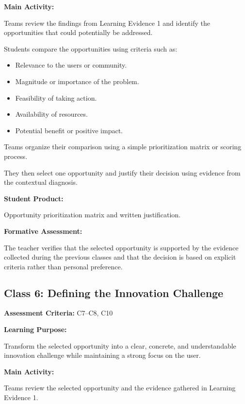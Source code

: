 \documentclass[12pt,a4paper]{article}
\begin{document}
	\textbf{Main Activity:}
	
	Teams review the findings from Learning Evidence 1 and identify the opportunities that could potentially be addressed.
	
	Students compare the opportunities using criteria such as:
	
	\begin{itemize}
		\item Relevance to the users or community.
		\item Magnitude or importance of the problem.
		\item Feasibility of taking action.
		\item Availability of resources.
		\item Potential benefit or positive impact.
	\end{itemize}
	
	Teams organize their comparison using a simple prioritization matrix or scoring process.
	
	They then select one opportunity and justify their decision using evidence from the contextual diagnosis.
	
	\textbf{Student Product:}
	
	Opportunity prioritization matrix and written justification.
	
	\textbf{Formative Assessment:}
	
	The teacher verifies that the selected opportunity is supported by the evidence collected during the previous classes and that the decision is based on explicit criteria rather than personal preference.
	
	
	\subsection{Class 6: Defining the Innovation Challenge}
	
	\textbf{Assessment Criteria:} C7--C8, C10
	
	\textbf{Learning Purpose:}
	
	Transform the selected opportunity into a clear, concrete, and understandable innovation challenge while maintaining a strong focus on the user.
	
	\textbf{Main Activity:}
	
	Teams review the selected opportunity and the evidence gathered in Learning Evidence 1.
	
\end{document}
